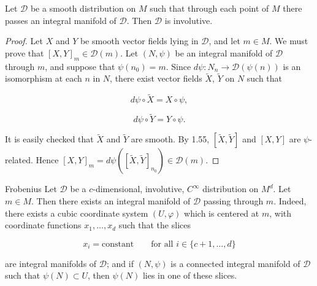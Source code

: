 \begin{proposition}\label{thm:1.59}
	Let $\mathcal{D}$ be a smooth distribution on $M$ such that through each point of $M$ there passes an integral manifold of $\mathcal{D}$. Then $\mathcal{D}$ is involutive.

\end{proposition}

\begin{proof}
	Let $X$ and $Y$ be smooth vector fields lying in $\mathcal{D}$, and let $m \in M$. We must prove that $[X, Y]_{m} \in \mathcal{D}(m)$. Let $(N, \psi)$ be an integral manifold of $\mathcal{D}$ through $m$, and suppose that $\psi(n_0) = m$. Since $d\psi: N_n \to \mathcal{D}(\psi(n))$ is an isomorphism at each $n$ in $N$, there exist vector fields $\widetilde{X}$, $\widetilde{Y}$ on $N$ such that

	\begin{equation}
		\tag{1}\label{eq:1.59:1}
		d\psi\circ\tilde{X}=X\circ\psi,
	\end{equation}

	\[
		d\psi\circ\tilde{Y}=Y\circ\psi.
	\]

	It is easily checked that $\tilde{X}$ and $\tilde{Y}$ are smooth. By 1.55, $[\tilde{X},\tilde{Y}]$ and $[X,Y]$ are $\psi$-related. Hence $[X,Y]_{m}=d\psi([\tilde{X},\tilde{Y}]_{n_{0}})\in\mathcal{D}(m)$.

\end{proof}

\begin{theorem}{Frobenius}\label{thm:1.60}
	Let $\mathcal{D}$ be a $c$-dimensional, involutive, $C^{\infty}$ distribution on $M^{d}$. Let $m\in M$. Then there exists an integral manifold of $\mathcal{D}$ passing through $m$. Indeed, there exists a cubic coordinate system $(U,\varphi)$ which is centered at $m$, with coordinate functions $x_{1},\ldots,x_{d}$ such that the slices

	\begin{equation}
		\tag{1}\label{eq:1.60:1}
		x_{i}=\mathrm{constant}\qquad\text{for all }i\in\{c+1,\ldots,d\}
	\end{equation}

	are integral manifolds of $\mathcal{D}$; and if $(N,\psi)$ is a connected integral manifold of $\mathcal{D}$ such that $\psi(N)\subset U$, then $\psi(N)$ lies in one of these slices.

\end{theorem}

